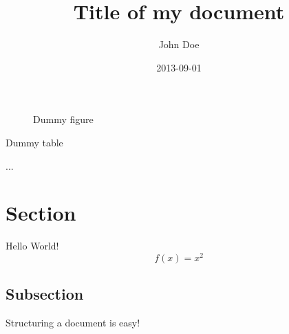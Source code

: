 \documentclass{article}
\title{Title of my document}
\date{2013-09-01}
\author{John Doe}
\begin{document}
\maketitle
{}
\begin{figure}
  \caption{Dummy figure}
\end{figure}

\begin{table}
  \caption{Dummy table}
\end{table}
...
\begin{appendix}
  \listoffigures
  \listoftables
\end{appendix}
\newpage
{}

\section{Section}

Hello World!
\begin{equation*}
  f(x) = x^2
\end{equation*}

\subsection{Subsection}

Structuring a document is easy!
\end{document}
